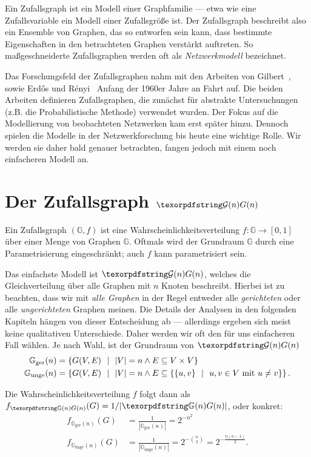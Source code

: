 Ein Zufallsgraph ist ein Modell einer Graphfamilie --- etwa wie eine Zufallsvariable ein Modell einer Zufallsgröße ist.
Der Zufallsgraph beschreibt also ein Ensemble von Graphen, das so entworfen sein kann, dass bestimmte Eigenschaften in den betrachteten Graphen verstärkt auftreten.
So maßgeschneiderte Zufallsgraphen werden oft als \emph{Netzwerkmodell} bezeichnet.

Das Forschungsfeld der Zufallsgraphen nahm mit den Arbeiten von Gilbert~\cite{gilbert_1959}, sowie Erd\H{o}s und R\'enyi~\cite{erdos_renyi_1960} Anfang der 1960er Jahre an Fahrt auf.
Die beiden Arbeiten definieren Zufallsgraphen, die zunächst für abstrakte Untersuchungen (z.B. die Probabilistische Methode) verwendet wurden.
Der Fokus auf die Modellierung von beobachteten Netzwerken kam erst später hinzu.
Dennoch spielen die Modelle in der Netzwerkforschung bis heute eine wichtige Rolle.
Wir werden sie daher bald genauer betrachten, fangen jedoch mit einem noch einfacheren Modell an.

\section{Der Zufallsgraph $\Gn$}
Ein Zufallsgraph $(\mathbb G, f)$ ist eine Wahrscheinlichkeitsverteilung $f\colon \mathbb G \to [0, 1]$ über einer Menge von Graphen $\mathbb G$.
Oftmals wird der Grundraum $\mathbb G$ durch eine Parametrisierung eingeschränkt; auch $f$ kann parametrisiert sein.

Das  einfachste Modell ist $\Gn$, welches die Gleichverteilung über alle Graphen mit $n$ Knoten beschreibt.
Hierbei ist zu beachten, dass wir mit \emph{alle Graphen} in der Regel entweder alle \emph{gerichteten} oder alle \emph{ungerichteten} Graphen meinen.
Die Details der Analysen in den folgenden Kapiteln hängen von dieser Entscheidung ab --- allerdings ergeben sich meist keine qualitativen Unterschiede.
Daher werden wir oft den für uns einfacheren Fall wählen.
Je nach Wahl, ist der Grundraum von $\Gn$
\begin{align}
    \mathbb G_\text{ger}(n)  & =
    \left\{ G(V,E) \ \ \middle|\ \ |V| = n \land E \subseteq V \times V \right\} \\\label{eq:gerichtet_gn}
    \mathbb G_\text{unge}(n) & =
    \left\{ G(V,E) \ \ \middle|\ \ |V| = n \land  E \subseteq \left\{ \left\{u,v\right\} \ \ \middle|\ \ u,v \in V \text{ mit } u \ne v \right\} \right\}.
\end{align}

\noindent Die Wahrscheinlichkeitsverteilung $f$ folgt dann als $f_{\gGn}(G) = 1 / | \gGn |$, oder konkret:
\begin{align}
    f_{\mathbb G_\text{ger}(n)}(G)  & =  \frac{1}{| \mathbb G_\text{ger}(n) |} = 2^{-n^2}\label{eq:gleichverteilt_gerichtet_gn} \\
    f_{\mathbb G_\text{unge}(n)}(G) & =  \frac{1}{| \mathbb G_\text{unge}(n) |} = 2^{-\binom n 2} = 2^{-\frac{n(n-1)}{2}}.
\end{align}

